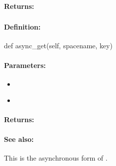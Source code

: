 \paragraph{Returns:}


\pagebreak
\subsubsection{}
\label{api:python:async_get}


\paragraph{Definition:}
\begin{pythoncode}
def async_get(self, spacename, key)
\end{pythoncode}

\paragraph{Parameters:}
\begin{itemize}[noitemsep]
\item {}\\

\item {}\\

\end{itemize}

\paragraph{Returns:}


\paragraph{See also:}  This is the asynchronous form of .

\pagebreak
\subsubsection{}
\label{api:python:get_partial}


